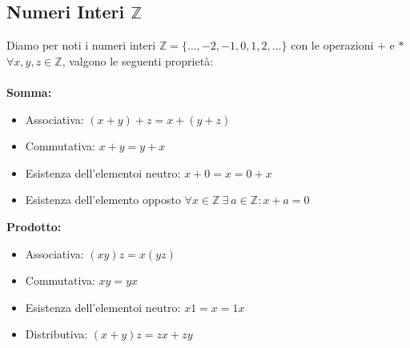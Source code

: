 \documentclass{report}
\begin{document}
\subsection{Numeri Interi $\mathbb{Z}$}
Diamo per noti i numeri interi $\mathbb{Z} = \{\dots, -2, -1, 0, 1, 2, \dots\}$ con le operazioni $+$ e $*$ $\forall x, y, z \in \mathbb{Z}$, valgono le seguenti proprietà:
\\ \\
\textbf{Somma:}
\begin{itemize}
    \item{Associativa: $(x + y) + z = x + (y + z)$}
    \item{Commutativa: $x + y = y + x$}
    \item{Esistenza dell'elementoi neutro: $x + 0 = x = 0 + x$}
    \item{Esistenza dell'elemento opposto $\forall x \in \mathbb{Z} \ \exists \  a \in \mathbb{Z} : x + a = 0$}
\end{itemize}
\textbf{Prodotto:}
\begin{itemize}
    \item{Associativa: $(xy)z = x(yz)$}
    \item{Commutativa: $xy = yx$}
    \item{Esistenza dell'elementoi neutro: $x1 = x = 1x$}
    \item{Distributiva: $(x + y)z = zx + zy$}
\end{itemize}
\end{document}
